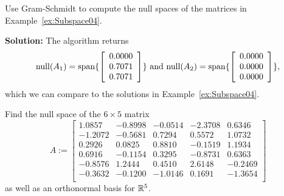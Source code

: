\vspace*{0.2cm}
\begin{example}
\label{ex:NullSpaceViaGramShcmidt}
Use Gram-Schmidt to compute the null spaces of the matrices in Example~\ref{ex:Subspace04}.
\end{example}

\textbf{Solution:} The algorithm returns
$$
\mathrm{null}(A_1)= \mathrm{span} \{ \left[
\begin{array}{c}
0.0000 \\
0.7071 \\
0.7071 \\
\end{array}
\right] \} \text{ and } \mathrm{null}(A_2)= \mathrm{span} \{ \left[
\begin{array}{c}
0.0000 \\
0.0000 \\
0.0000 \\
\end{array}
\right] \},
$$
which we can compare to the solutions in Example~\ref{ex:Subspace04}.
\Qed
\vspace*{0.5cm}

\begin{example} Find the null space of the $6 \times 5$ matrix
\begin{equation}
A:=\left[
\begin{array}{rrrrr}
1.0857 & -0.8998 & -0.0514 & -2.3708 & 0.6346 \\
-1.2072 & -0.5681 & 0.7294 & 0.5572 & 1.0732 \\
0.2926 & 0.0825 & 0.8810 & -0.1519 & 1.1934 \\
0.6916 & -0.1154 & 0.3295 & -0.8731 & 0.6363 \\
-0.8576 & 1.2444 & 0.4510 & 2.6148 & -0.2469 \\
-0.3632 & -0.1200 & -1.0146 & 0.1691 & -1.3654 \\
\end{array}
\right]
\end{equation}
as well as an orthonormal basis for $\mathbb R^5$.
\end{example}

